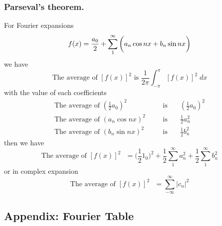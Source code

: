 \documentclass[../../../main.tex]{subfiles}
\begin{document}
\subsubsection{Parseval's theorem.} For Fourier expansions
\begin{equation*}
    f(x)=\frac{a_0}{2}+\sum_{1}^{\infty}\bigg(a_n\cos nx +b_n\sin nx\bigg)\\
\end{equation*}
we have
\begin{equation*}
    \text{The average of $[f(x)]^2$ is } \frac{1}{2\pi}\int_{-\pi}^{\pi} [f(x)]^2\; dx
\end{equation*}
with the value of each coefficients
\begin{align*}
    \text{The average of $(\frac{1}{2}a_0)^2$ }\quad & \text{is}\quad & (\frac{1}{2}a_0)^2 \\
    \text{The average of $(a_n\cos nx)^2$ }\quad     & \text{is}\quad & \frac{1}{2}a_n^2   \\
    \text{The average of $(b_n\sin nx)^2$ }\quad     & \text{is}\quad & \frac{1}{2}b_n^2
\end{align*}
then we have
\begin{equation*}
    \text{The average of $[f(x)]^2$ }=\bigg(\frac{1}{2}1_0\bigg)^2+\frac{1}{2}\sum_{1}^{\infty}a_n^2+\frac{1}{2}\sum_{1}^{\infty}b_n^2
\end{equation*}
or in complex expansion
\begin{equation*}
    \text{The average of $[f(x)]^2$ }=\sum_{-\infty}^{\infty}|c_n|^2
\end{equation*}

\subsection{Appendix: Fourier Table}
\end{document}
